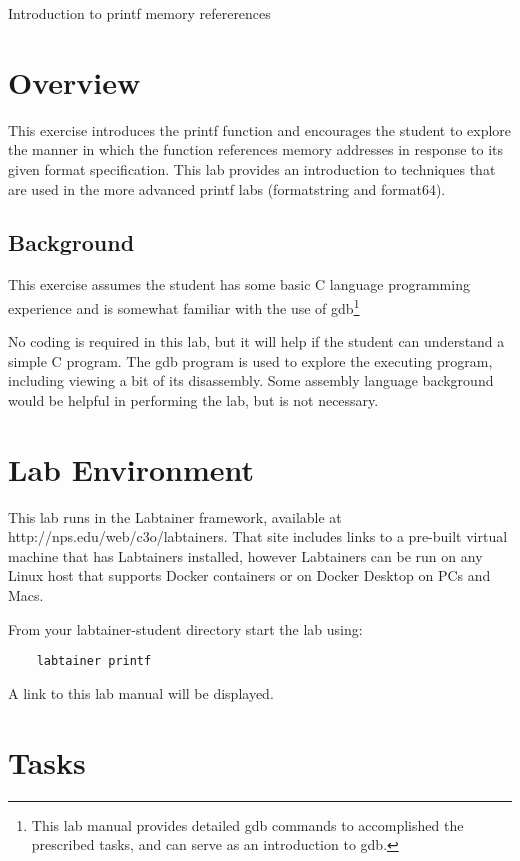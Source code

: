 


\begin{center}
{\LARGE Introduction to printf memory refererences}
\vspace{0.1in}\\
\end{center}


\section{Overview}
This exercise introduces the printf function and 
encourages the student to explore the manner in which the
function references memory addresses in response to its
given format specification.
This lab provides an introduction to techniques that are used
in the more advanced printf labs (formatstring and format64).

\subsection{Background}
This exercise assumes the student has some basic C language programming
experience and is somewhat familiar with the use of gdb\footnote{This lab
manual provides detailed gdb commands to accomplished the prescribed tasks,
and can serve as an introduction to gdb.}

No coding is required in this lab, but it will help if the student
can understand a simple C program.
The gdb program is used to explore the executing program, including viewing
a bit of its disassembly.  Some assembly language background 
would be helpful in performing the lab, but is not necessary.

\section{Lab Environment}
This lab runs in the Labtainer framework,
available at http://nps.edu/web/c3o/labtainers.
That site includes links to a pre-built virtual machine
that has Labtainers installed, however Labtainers can
be run on any Linux host that supports Docker containers
or on Docker Desktop on PCs and Macs.

From your labtainer-student directory start the lab using:
\begin{verbatim}
    labtainer printf
\end{verbatim}
A link to this lab manual will be displayed.


\section{Tasks}

